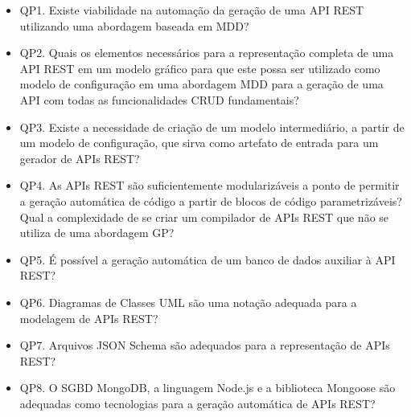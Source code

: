 \begin{itemize}
  \item QP1. Existe viabilidade na automação da geração de uma API REST utilizando uma abordagem baseada em MDD?
  \item QP2. Quais os elementos necessários para a representação completa de uma API REST em um modelo gráfico para que este possa ser utilizado como modelo de configuração em uma abordagem MDD para a geração de uma API com todas as funcionalidades CRUD fundamentais?
  \item QP3. Existe a necessidade de criação de um modelo intermediário, a partir de um modelo de configuração, que sirva como artefato de entrada para um gerador de APIs REST?
  \item QP4. As APIs REST são suficientemente modularizáveis a ponto de permitir a geração automática de código a partir de blocos de código parametrizáveis? Qual a complexidade de se criar um compilador de APIs REST que não se utiliza de uma abordagem GP?
  \item QP5. É possível a geração automática de um banco de dados auxiliar à API REST?
  \item QP6. Diagramas de Classes UML são uma notação adequada para a modelagem de APIs REST?
  \item QP7. Arquivos JSON Schema são adequados para a representação de APIs REST?
  \item QP8. O SGBD MongoDB, a linguagem Node.js e a biblioteca Mongoose são adequadas como tecnologias para a geração automática de APIs REST?
\end{itemize}
